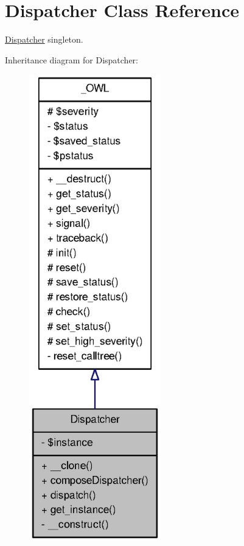 \section{Dispatcher Class Reference}
\label{classDispatcher}


\hyperlink{classDispatcher}{Dispatcher} singleton.  




Inheritance diagram for Dispatcher:\nopagebreak
\begin{figure}[H]
\begin{center}
\leavevmode
\includegraphics[width=162pt]{classDispatcher__inherit__graph}
\end{center}
\end{figure}


